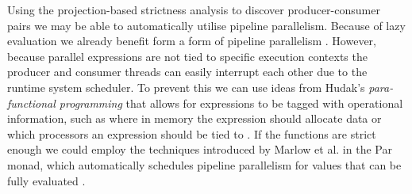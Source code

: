 Using the projection-based strictness analysis to discover producer-consumer
pairs we may be able to automatically utilise pipeline parallelism. Because of
lazy evaluation we already benefit form a form of pipeline parallelism
\citep{whyFPmatters}. However, because parallel expressions are not tied to
specific execution contexts  the producer and consumer threads can easily interrupt
each other due to the runtime system scheduler. To prevent this we can use
ideas from Hudak's \emph{para-functional programming} that allows for
expressions to be tagged with operational information, such as where in memory
the expression should allocate data or which processors an expression should be
tied to \cite{hudak1986functional}. If the functions are strict enough we could
employ the techniques introduced by Marlow et al. in the Par monad, which
automatically schedules pipeline parallelism for values that can be fully
evaluated \cite{marlow2011monad}.
